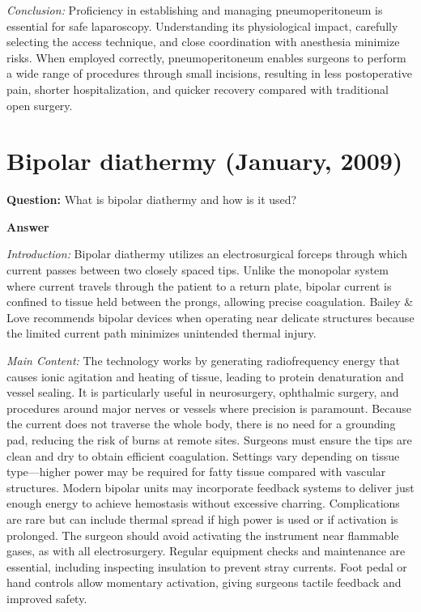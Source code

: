 \documentclass{article}
\begin{document}
\emph{Conclusion:} Proficiency in establishing and managing pneumoperitoneum is essential for safe laparoscopy. Understanding its physiological impact, carefully selecting the access technique, and close coordination with anesthesia minimize risks. When employed correctly, pneumoperitoneum enables surgeons to perform a wide range of procedures through small incisions, resulting in less postoperative pain, shorter hospitalization, and quicker recovery compared with traditional open surgery.


\section{Bipolar diathermy (January, 2009)}


\textbf{Question:} What is bipolar diathermy and how is it used?

\textbf{Answer}

\emph{Introduction:} Bipolar diathermy utilizes an electrosurgical forceps through which current passes between two closely spaced tips. Unlike the monopolar system where current travels through the patient to a return plate, bipolar current is confined to tissue held between the prongs, allowing precise coagulation. Bailey \& Love recommends bipolar devices when operating near delicate structures because the limited current path minimizes unintended thermal injury.

\emph{Main Content:} The technology works by generating radiofrequency energy that causes ionic agitation and heating of tissue, leading to protein denaturation and vessel sealing. It is particularly useful in neurosurgery, ophthalmic surgery, and procedures around major nerves or vessels where precision is paramount. Because the current does not traverse the whole body, there is no need for a grounding pad, reducing the risk of burns at remote sites. Surgeons must ensure the tips are clean and dry to obtain efficient coagulation. Settings vary depending on tissue type—higher power may be required for fatty tissue compared with vascular structures. Modern bipolar units may incorporate feedback systems to deliver just enough energy to achieve hemostasis without excessive charring. Complications are rare but can include thermal spread if high power is used or if activation is prolonged. The surgeon should avoid activating the instrument near flammable gases, as with all electrosurgery. Regular equipment checks and maintenance are essential, including inspecting insulation to prevent stray currents. Foot pedal or hand controls allow momentary activation, giving surgeons tactile feedback and improved safety.
\end{document}
